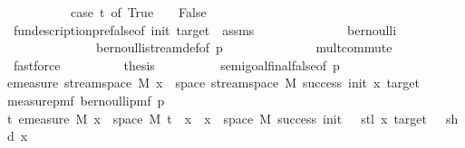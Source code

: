 \begin{isabellebody}
\ \ \ \ \ \ \ \ \ \ {\isacharparenleft}{\kern0pt}case\ t\ of\ True\ {\isasymRightarrow}\ {}\ {\isacharbar}{\kern0pt}\ False\ {\isasymRightarrow}\ {}{\isacharparenright}{\kern0pt}{\isacharparenright}{\kern0pt}{\isachardoublequoteclose}\isanewline
\ \ \ \ \ \ \ \ \isamarkupfalse%
\ fun{\isacharunderscore}{\kern0pt}description{\isacharunderscore}{\kern0pt}pre{\isacharunderscore}{\kern0pt}false{\isacharbrackleft}{\kern0pt}of\ init\ target\ {\isacharunderscore}{\kern0pt}{\isacharbrackright}{\kern0pt}\ assms\isanewline
\ \ \ \ \ \ \ \ \ \ \ \ \ \ bernoulli\isanewline
\ \ \ \ \ \ \ \ \ \ \ \ \ \ bernoulli{\isacharunderscore}{\kern0pt}stream{\isacharunderscore}{\kern0pt}def{\isacharbrackleft}{\kern0pt}of\ p{\isacharbrackright}{\kern0pt}\isanewline
\ \ \ \ \ \ \ \ \ \ \ \ \ \ mult{\isachardot}{\kern0pt}commute\ \isanewline
\ \ \ \ \ \ \ \ \isamarkupfalse%
\ fastforce\isanewline
\ \ \ \ \ \ \isamarkupfalse%
\ \isamarkupfalse%
\ {\isacharquery}{\kern0pt}thesis\isanewline
\ \ \ \ \ \ \ \ \isamarkupfalse%
\ semi{\isacharunderscore}{\kern0pt}goal{}{\isacharunderscore}{\kern0pt}final{\isacharunderscore}{\kern0pt}false{\isacharbrackleft}{\kern0pt}of\ p\isanewline
{\isachardoublequoteopen}emeasure\ {\isacharparenleft}{\kern0pt}stream{\isacharunderscore}{\kern0pt}space\ {\isacharquery}{\kern0pt}M{\isacharparenright}{\kern0pt}\ {\isacharbraceleft}{\kern0pt}x\ {\isasymin}\ space\ {\isacharparenleft}{\kern0pt}stream{\isacharunderscore}{\kern0pt}space\ {\isacharquery}{\kern0pt}M{\isacharparenright}{\kern0pt}{\isachardot}{\kern0pt}\ success\ {\isacharparenleft}{\kern0pt}init{\isacharminus}{\kern0pt}{}{\isacharparenright}{\kern0pt}\ {\isacharparenleft}{\kern0pt}x{\isacharparenright}{\kern0pt}\ target{\isacharbraceright}{\kern0pt}{\isachardoublequoteclose}\ \isanewline
{\isachardoublequoteopen}measure{\isacharunderscore}{\kern0pt}pmf\ {\isacharparenleft}{\kern0pt}bernoulli{\isacharunderscore}{\kern0pt}pmf\ p{\isacharparenright}{\kern0pt}{\isachardoublequoteclose}\isanewline
{\isachardoublequoteopen}{\isasymlambda}t{\isachardot}{\kern0pt}\ emeasure\ M\ {\isacharbraceleft}{\kern0pt}x\ {\isasymin}\ space\ M{\isachardot}{\kern0pt}\ {\isacharparenleft}{\kern0pt}t{\isacharparenright}{\kern0pt}\ {\isacharhash}{\kern0pt}{\isacharhash}{\kern0pt}\ x\ {\isasymin}\ {\isacharbraceleft}{\kern0pt}x\ {\isasymin}\ space\ M{\isachardot}{\kern0pt}\ success\ {\isacharparenleft}{\kern0pt}init\ {\isacharminus}{\kern0pt}\ {}{\isacharparenright}{\kern0pt}\ {\isacharparenleft}{\kern0pt}stl\ x{\isacharparenright}{\kern0pt}\ target\ {\isasymand}\ {\isasymnot}\ shd\ x{\isacharbraceright}{\kern0pt}{\isacharbraceright}{\kern0pt}{\isachardoublequoteclose}{\isacharbrackright}{\kern0pt}\ \ \ \isanewline

\end{isabellebody}
